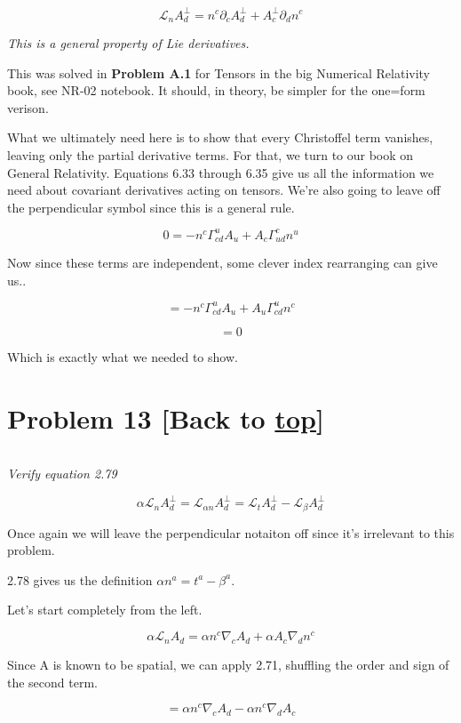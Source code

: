 \documentclass[landscape,letterpaper,10pt,english]{article}
\begin{document}
\[ \mathcal{L}_n A^\perp_d = n^c \partial_c A^\perp_d + A^\perp_c \partial_d n^c \]

\emph{This is a general property of Lie derivatives.}

This was solved in \textbf{Problem A.1} for Tensors in the big Numerical
Relativity book, see NR-02 notebook. It should, in theory, be simpler
for the one=form verison.

    What we ultimately need here is to show that every Christoffel term
vanishes, leaving only the partial derivative terms. For that, we turn
to our book on General Relativity. Equations 6.33 through 6.35 give us
all the information we need about covariant derivatives acting on
tensors. We're also going to leave off the perpendicular symbol since
this is a general rule.

\[ 0 = - n^c \Gamma^u_{cd} A_u + A_c \Gamma^c_{ud} n^u \]

Now since these terms are independent, some clever index rearranging can
give us..

\[ = - n^c \Gamma^u_{cd} A_u + A_u \Gamma^u_{cd} n^c \]

\[ = 0 \]

Which is exactly what we needed to show.

    \hypertarget{problem-13-back-to-top}{%
\section{\texorpdfstring{Problem 13 {[}Back to
\hyperref[toc]{top}{]}}{Problem 13 {[}Back to {]}}}\label{problem-13-back-to-top}}

\[\label{P13}\]

\emph{Verify equation 2.79}

\[\alpha \mathcal{L}_n A^\perp_d = \mathcal{L}_{\alpha n} A^\perp_d = \mathcal{L}_t A^\perp_d - \mathcal{L}_\beta A^\perp_d \]

Once again we will leave the perpendicular notaiton off since it's
irrelevant to this problem.

    2.78 gives us the definition \(\alpha n^a = t^a - \beta^a\).

Let's start completely from the left.

\[\alpha \mathcal{L}_n A_d =  \alpha n^c \nabla_c A_d + \alpha A_c \nabla_d n^c\]

Since A is known to be spatial, we can apply 2.71, shuffling the order
and sign of the second term.

\[ =  \alpha n^c \nabla_c A_d - \alpha n^c \nabla_d A_c \]
\end{document}
